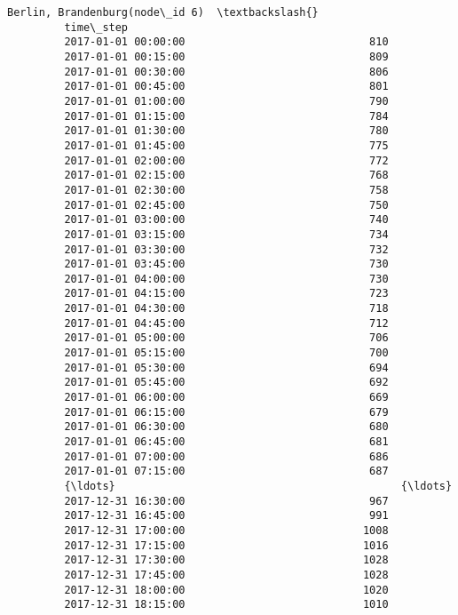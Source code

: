 \documentclass[11pt]{article}
\begin{document}
\begin{Verbatim}[commandchars=\\\{\}]
                              Berlin, Brandenburg(node\_id 6)  \textbackslash{}
         time\_step                                             
         2017-01-01 00:00:00                             810   
         2017-01-01 00:15:00                             809   
         2017-01-01 00:30:00                             806   
         2017-01-01 00:45:00                             801   
         2017-01-01 01:00:00                             790   
         2017-01-01 01:15:00                             784   
         2017-01-01 01:30:00                             780   
         2017-01-01 01:45:00                             775   
         2017-01-01 02:00:00                             772   
         2017-01-01 02:15:00                             768   
         2017-01-01 02:30:00                             758   
         2017-01-01 02:45:00                             750   
         2017-01-01 03:00:00                             740   
         2017-01-01 03:15:00                             734   
         2017-01-01 03:30:00                             732   
         2017-01-01 03:45:00                             730   
         2017-01-01 04:00:00                             730   
         2017-01-01 04:15:00                             723   
         2017-01-01 04:30:00                             718   
         2017-01-01 04:45:00                             712   
         2017-01-01 05:00:00                             706   
         2017-01-01 05:15:00                             700   
         2017-01-01 05:30:00                             694   
         2017-01-01 05:45:00                             692   
         2017-01-01 06:00:00                             669   
         2017-01-01 06:15:00                             679   
         2017-01-01 06:30:00                             680   
         2017-01-01 06:45:00                             681   
         2017-01-01 07:00:00                             686   
         2017-01-01 07:15:00                             687   
         {\ldots}                                             {\ldots}   
         2017-12-31 16:30:00                             967   
         2017-12-31 16:45:00                             991   
         2017-12-31 17:00:00                            1008   
         2017-12-31 17:15:00                            1016   
         2017-12-31 17:30:00                            1028   
         2017-12-31 17:45:00                            1028   
         2017-12-31 18:00:00                            1020   
         2017-12-31 18:15:00                            1010   

\end{Verbatim}
\end{document}
